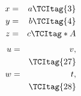 \documentclass{article}
\begin{document}
\begin{eqnarray}
x &=& a \TCItag{3} \\
y &=& b \TCItag{4} \\
z &=& c \TCItag*{A}
\end{eqnarray}
\begin{eqnarray}
u &=& v, \nonumber \\
&& \TCItag{27} \\
w &=& t, \nonumber \\
&& \TCItag{28}
\end{eqnarray}
\end{document}
